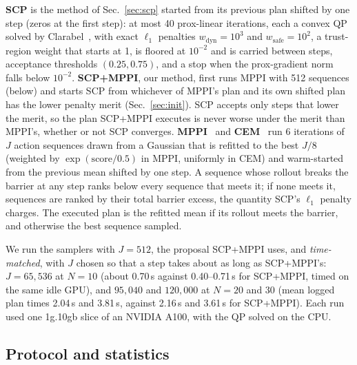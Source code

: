 \textbf{SCP} is the method of Sec.~\ref{sec:scp} started from its previous plan shifted by one step (zeros at the first
step): at most 40 prox-linear iterations, each a convex QP solved by Clarabel~\citep{goulart2024clarabel}, with exact
$\ell_1$ penalties $w_{\mathrm{dyn}}=10^3$ and $w_{\mathrm{safe}}=10^2$, a trust-region weight that starts at 1, is
floored at $10^{-2}$ and is carried between steps, acceptance thresholds $(0.25,0.75)$, and a stop when the
prox-gradient norm falls below $10^{-2}$.
\textbf{SCP+MPPI}, our method, first runs MPPI with 512 sequences (below) and starts SCP from whichever of MPPI's plan
and its own shifted plan has the lower penalty merit (Sec.~\ref{sec:init}). SCP accepts only steps that lower the
merit, so the plan SCP+MPPI executes is never worse under the merit than MPPI's, whether or not SCP converges.
\textbf{MPPI}~\citep{williams2017information} and \textbf{CEM}~\citep{rubinstein1999cross} run 6 iterations of $J$
action sequences drawn from a Gaussian that is refitted to the best $J/8$ (weighted by $\exp(\text{score}/0.5)$ in MPPI,
uniformly in CEM) and warm-started from the previous mean shifted by one step. A sequence whose rollout breaks the
barrier at any step ranks below every sequence that meets it; if none meets it, sequences are ranked by their total
barrier excess, the quantity SCP's $\ell_1$ penalty charges. The executed plan is the refitted mean if its rollout
meets the barrier, and otherwise the best sequence sampled.

We run the samplers with $J=512$, the proposal SCP+MPPI uses, and \emph{time-matched}, with $J$ chosen so that a step
takes about as long as SCP+MPPI's: $J=65{,}536$ at $N=10$ (about 0.70\,s against 0.40--0.71\,s for SCP+MPPI, timed on
the same idle GPU), and $95{,}040$ and $120{,}000$ at $N=20$ and $30$ (mean logged plan times 2.04\,s and 3.81\,s,
against 2.16\,s and 3.61\,s for SCP+MPPI). Each run used one 1g.10gb slice of an NVIDIA A100, with the QP solved on the
CPU.

\subsection{Protocol and statistics}\label{sec:protocol}

